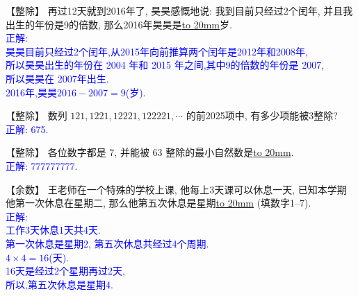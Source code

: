 
\item {
    【整除】
    再过12天就到2016年了, 昊昊感慨地说: 我到目前只经过2个闰年, 并且我出生的年份是9的倍数, 那么2016年昊昊是\underline{\hbox to 20mm{}}岁. 
    \ifshowSolution 
        \fangsong{}\textcolor{blue}{
            \\正解: \\
            昊昊目前只经过2个闰年,从2015年向前推算两个闰年是2012年和2008年,\\
            所以昊昊出生的年份在 2004 年和 2015 年之间,其中9的倍数的年份是 2007,\\
            所以昊昊在 2007年出生.\\
            2016年,昊昊$2016-2007=9$(岁).
        }
    \else
        \vspace{1cm}
    \fi
}

\item {
    【整除】
    数列 $121, 1221, 12221, 122221,\cdots$ 的前2025项中, 有多少项能被3整除? 
    \ifshowSolution
        \\\fangsong{}\textcolor{blue}{
            正解: 675.
        }
    \else
        \vspace{1cm}
    \fi
}

\item {
    【整除】
    各位数字都是 7, 并能被 63 整除的最小自然数是\underline{\hbox to 20mm{}}.
    \ifshowSolution
        \\\fangsong{}\textcolor{blue}{
            正解: 777777777.
        }
    \else
        \vspace{1cm}
    \fi
}

\item {
    【余数】
    王老师在一个特殊的学校上课, 他每上3天课可以休息一天, 已知本学期他第一次休息在星期二, 那么他第五次休息是星期\underline{\hbox to 20mm{}} (填数字1--7).
    \ifshowSolution
        \\\fangsong{}\textcolor{blue}{
            正解: \\
            工作3天休息1天共4天.\\
            第一次休息是星期2, 第五次休息共经过4个周期.\\
            $4\times 4=16$(天).\\
            16天是经过2个星期再过2天,\\
            所以,第五次休息是星期4.
        }
    \else
        \vspace{1cm}
    \fi
}

